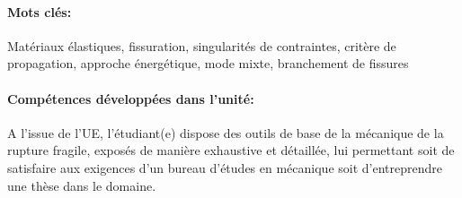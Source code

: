 \paragraph{Mots clés:}
Matériaux élastiques, fissuration, singularités de contraintes, critère de propagation, approche énergétique, mode mixte, branchement de fissures

\paragraph{Compétences développées dans l’unité:}
A l’issue de l’UE, l’étudiant(e) dispose des outils de base de la mécanique de la rupture fragile, exposés de manière exhaustive et détaillée, lui permettant soit de satisfaire aux exigences d’un bureau d’études en mécanique soit d’entreprendre une thèse dans le domaine. 